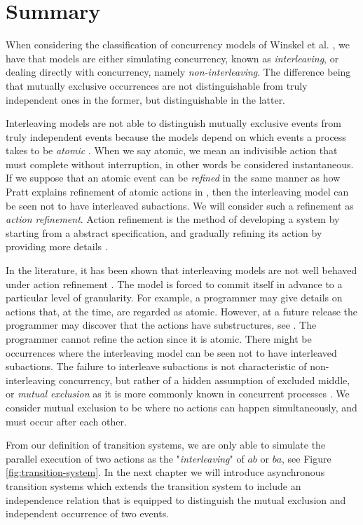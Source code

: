 \section{Summary}
    \label{sec:traditional-concurrency-summary}

    When considering the classification of concurrency models of Winskel et al. \cite{winskel94RelationshipsConcurrency}, we have that models are either simulating concurrency, known as \emph{interleaving}, or dealing directly with concurrency, namely \emph{non-interleaving}. The difference being that mutually exclusive occurrences are not distinguishable from truly independent ones in the former, but distinguishable in the latter.
    
    Interleaving models are not able to distinguish mutually exclusive events from truly independent events because the models depend on which events a process takes to be \emph{atomic} \cite[page 4]{Pratt86pomsets}. When we say atomic, we mean an indivisible action that must complete without interruption, in other words be considered instantaneous. If we suppose that an atomic event can be \emph{refined} in the same manner as how Pratt explains refinement of atomic actions in \cite{pratt91hda}, then the interleaving model can be seen not to have interleaved subactions. We will consider such a refinement as \emph{action refinement}. Action refinement is the method of developing a system by starting from a abstract specification, and gradually refining its action by providing more details \cite{Johansen16DecEventBasedConcurrencyRefinement, GlabbeekG89refinement}.
    
    In the literature, it has been shown that interleaving models are not well behaved under action refinement \cite{GlabbeekG89refinement, GlabbeekG01refinement}. The model is forced to commit itself in advance to a particular level of granularity. For example, a programmer may give details on actions that, at the time, are regarded as atomic. However, at a future release the programmer may discover that the actions have substructures, see \cite[Example 1.1]{GlabbeekG89refinement}. The programmer cannot refine the action since it is atomic. There might be occurrences where the interleaving model can be seen not to have interleaved subactions. The failure  to interleave subactions is not characteristic of non-interleaving concurrency, but rather of a hidden assumption of excluded middle, or \emph{mutual exclusion} as it is more commonly known in concurrent processes \cite{Pratt00Sculptures}. We consider mutual exclusion to be where no actions can happen simultaneously, and must occur after each other.
    
    From our definition of transition systems, we are only able to simulate the parallel execution of two actions as the "\emph{interleaving}" of $ab$ or $ba$, see Figure \ref{fig:transition-system}. In the next chapter we will introduce asynchronous transition systems which extends the transition system to include an independence relation that is equipped to distinguish the mutual exclusion and independent occurrence of two events.